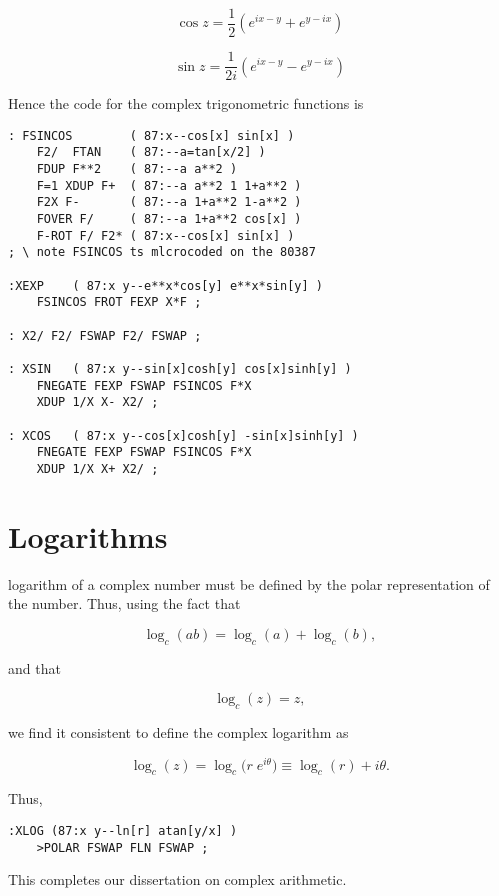 \begin{equation}
  \cos z = \frac{1}{2 }\left(e^{ix-y} + e^{y - ix}\right)
\end{equation}

\begin{equation}
  \sin z = \frac{1}{2i}\left(e^{ix-y} - e^{y - ix}\right)
\end{equation}

Hence the code for the complex trigonometric functions is

\begin{lstlisting}
: FSINCOS        ( 87:x--cos[x] sin[x] )
    F2/  FTAN    ( 87:--a=tan[x/2] )
    FDUP F**2    ( 87:--a a**2 )
    F=1 XDUP F+  ( 87:--a a**2 1 1+a**2 )
    F2X F-       ( 87:--a 1+a**2 1-a**2 )
    FOVER F/     ( 87:--a 1+a**2 cos[x] )
    F-ROT F/ F2* ( 87:x--cos[x] sin[x] )
; \ note FSINCOS ts mlcrocoded on the 80387

:XEXP    ( 87:x y--e**x*cos[y] e**x*sin[y] )
    FSINCOS FROT FEXP X*F ;

: X2/ F2/ FSWAP F2/ FSWAP ;

: XSIN   ( 87:x y--sin[x]cosh[y] cos[x]sinh[y] )
    FNEGATE FEXP FSWAP FSINCOS F*X
    XDUP 1/X X- X2/ ;

: XCOS   ( 87:x y--cos[x]cosh[y] -sin[x]sinh[y] )
    FNEGATE FEXP FSWAP FSINCOS F*X
    XDUP 1/X X+ X2/ ;
\end{lstlisting}

\section{Logarithms}
 logarithm of a complex number must be defined by the polar representation of the number. Thus, using the fact that

\begin{equation}
  \log_c(ab) = \log_c(a) + \log_c(b) ,
\end{equation}

and that

\begin{equation}
  \log_c(z) = z ,
\end{equation}

we find it consistent to define the complex logarithm as

\begin{equation}
  \log_c(z) = \log_c\big(r\;e^{i\theta}\big) \equiv \log_c(r) + i\theta.
\end{equation}

Thus,

\begin{lstlisting}
:XLOG (87:x y--ln[r] atan[y/x] )
    >POLAR FSWAP FLN FSWAP ;
\end{lstlisting}

This completes our dissertation on complex arithmetic.
